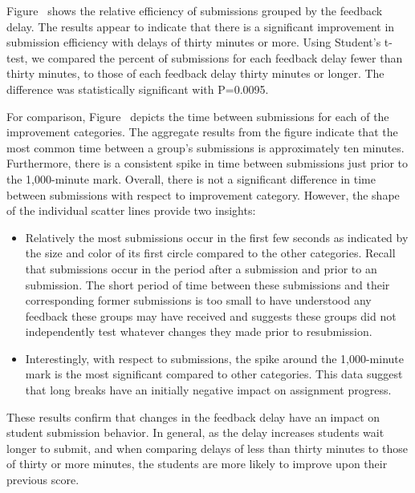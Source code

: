 Figure~ shows the relative efficiency of
submissions grouped by the feedback delay. The results appear to indicate that
there is a significant improvement in submission efficiency with delays of
thirty minutes or more. Using Student's t-test, we compared the percent of
\imp{} submissions for each feedback delay fewer than thirty minutes, to those
of each feedback delay thirty minutes or longer. The difference was
statistically significant with P=0.0095.

For comparison, Figure~ depicts the time between
submissions for each of the improvement categories. The aggregate results from
the figure indicate that the most common time between a group's submissions is
approximately ten minutes. Furthermore, there is a consistent spike in time
between submissions just prior to the 1,000-minute mark. Overall, there is not
a significant difference in time between submissions with respect to
improvement category. However, the shape of the individual scatter lines
provide two insights:

\begin{itemize}
\item Relatively the most \noii{} submissions occur in the first few seconds as
  indicated by the size and color of its first circle compared to the other
  categories. Recall that \noii{} submissions occur in the period after a
  \worse{} submission and prior to an \imp{} submission. The short period of
  time between these submissions and their corresponding former submissions is
  too small to have understood any feedback these groups may have received and
  suggests these groups did not independently test whatever changes they made
  prior to resubmission.
\item Interestingly, with respect to \worse{} submissions, the spike around the
  1,000-minute mark is the most significant compared to other categories. This
  data suggest that long breaks have an initially negative impact on assignment
  progress.
\end{itemize}

These results confirm that changes in the feedback delay have an impact on
student submission behavior. In general, as the delay increases students wait
longer to submit, and when comparing delays of less than thirty minutes to
those of thirty or more minutes, the students are more likely to improve upon
their previous score.

